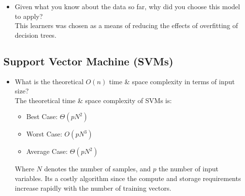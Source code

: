 \documentclass[12pt]{article}
\begin{document}
\begin{itemize}
\item Given what you know about the data so far, why did you choose this model to apply?\\
This learners was chosen as a means of reducing the effects of overfitting of decision trees.
\end{itemize} 




\subsection*{Support Vector Machine (SVMs)}
\begin{itemize}
\item What is the theoretical $O(n)$ time \& space complexity in terms of input size?\\
The theoretical time \& space complexity of SVMs is:
\begin{itemize}[noitemsep,nolistsep]
\item Best Case: $\Theta(pN^2)$ 
\item Worst Case: $O(pN^3)$
\item Average Case: $\Theta(pN^2)$
\end{itemize}
Where $N$ denotes the number of samples, and $p$ the number of input variables. 
Its a costly algorithm since the compute and storage requirements increase rapidly with the number of training vectors.


\end{itemize}
\end{document}
